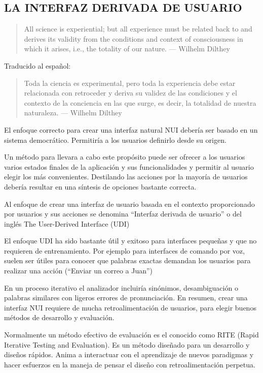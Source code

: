 \subsection{\uppercase{La interfaz derivada de usuario}}
\label{sec:interfazderivada}
\begin{quote}
All science is experiential; but all experience must be related back to and derives its
validity from the conditions and context of consciousness in which it arises, i.e., the
totality of our nature.
— Wilhelm Dilthey
\end{quote}

Traducido al español:

\begin{quote}
Toda la ciencia es experimental, pero toda la experiencia debe estar relacionada
con retroceder y deriva su validez de las condiciones y el contexto de la
conciencia en las que surge, es decir, la totalidad de nuestra naturaleza.
— Wilhelm Dilthey
\end{quote}

El enfoque correcto para crear una interfaz natural NUI debería ser basado en un
sistema democrático. Permitiría a los usuarios definirlo desde su origen. 

Un método para llevara a cabo este propósito puede ser ofrecer a los usuarios
varios estados finales de la aplicación y sus funcionalidades y permitir al
usuario elegir los más convenientes. Destilando las acciones por la mayoría de
usuarios debería resultar en una síntesis de opciones bastante correcta.

Al enfoque de crear una interfaz de usuario basada en el contexto proporcionado
por usuarios y sus acciones se denomina ``Interfaz derivada de usuario'' o del
inglés The User-Derived Interface (\acs{UDI}\label{acro:UDI})

El enfoque UDI ha sido bastante útil y exitoso para interfaces pequeñas y que no
requieren de entrenamiento. Por ejemplo para interfaces de comando por voz,
suelen ser útiles para conocer que palabras exactas demandan los usuarios para
realizar una acción (``Enviar un correo a Juan'')

\newpage

En un proceso iterativo el analizador incluiría sinónimos, desambiguación o
palabras similares con ligeros errores de pronunciación. En resumen, crear una
interfaz NUI requiere de mucha retroalimentación de usuarios, para elegir 
buenos métodos de desarrollo y evaluación.

Normalmente un método efectivo de evaluación es el conocido como \acs{RITE}\label{acro:RITE} (Rapid
Iterative Testing and Evaluation). Es un método diseñado para un desarrollo y
diseños rápidos. Anima a interactuar con el aprendizaje de nuevos paradigmas y
hacer esfuerzos en la maneja de pensar el diseño con retroalimentación perpetua.

